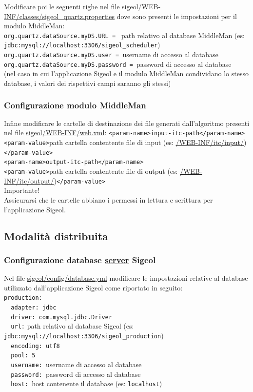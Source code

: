 \documentclass[11pt,a4paper]{article}
\begin{document}
Modificare poi le seguenti righe nel file \url{sigeol/WEB-INF/classes/sigeol_quartz.properties} dove sono presenti le impostazioni per il modulo MiddleMan:\\
\verb|org.quartz.dataSource.myDS.URL = | path relativo al database MiddleMan (es: \verb|jdbc:mysql://localhost:3306/sigeol_scheduler|)\\
\verb|org.quartz.dataSource.myDS.user = |username di accesso al database\\
\verb|org.quartz.dataSource.myDS.password = |password di accesso al database\\

(nel caso in cui l'applicazione Sigeol e il modulo MiddleMan condividano lo stesso database, i valori dei rispettivi campi saranno gli stessi)

\subsubsection{Configurazione modulo MiddleMan}
Infine modificare le cartelle di destinazione dei file generati dall'algoritmo presenti nel file \url{sigeol/WEB-INF/web.xml}:
\verb|<param-name>input-itc-path</param-name>|\\
\verb|<param-value>|path cartella contentente file di input (es: \url{/WEB-INF/itc/input/})\verb|</param-value>|\\
\verb|<param-name>output-itc-path</param-name>|\\
\verb|<param-value>|path cartella contentente file di output (es: \url{/WEB-INF/itc/output/})\verb|</param-value>|\\
Importante!\\
Assicurarsi che le cartelle abbiano i permessi in lettura e scrittura per l'applicazione Sigeol.

\subsection{Modalità distribuita}
\subsubsection{Configurazione database \underline{server} Sigeol}
Nel file \url{sigeol/config/database.yml} modificare le impostazioni relative al database utilizzato dall'applicazione Sigeol come riportato in seguito:\\
\verb|production:| \\
\verb|  adapter: jdbc |\\
\verb|  driver: com.mysql.jdbc.Driver |\\
\verb|  url:| path relativo al database Sigeol (es: \verb|jdbc:mysql://localhost:3306/sigeol_production|)\\
\verb|  encoding: utf8 |\\
\verb|  pool: 5 |\\
\verb|  username: |username di accesso al database\\
\verb|  password: |password di accesso al database\\
\verb|  host: |host contenente il database (es: \verb|localhost|)
\end{document}
